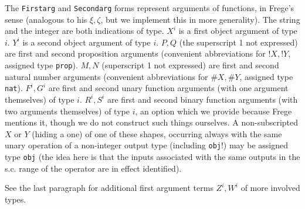 \documentclass{article}
\begin{document}
{{The {\tt Firstarg} and {\tt Secondarg} forms represent arguments of functions, in Frege's sense (analogous to his $\xi, \zeta$, but we implement this in more generality).  The string and the integer are both indications of type.  $X^i$ is a first object argument of type $i$.  $Y^i$ is a second object argument of type $i$.  $P, Q$ (the superscript 1 not expressed) are first and second proposition arguments (convenient abbreviations for $!X, !Y$, assigned type {\tt prop}).  $M, N$ (superscript 1 not expressed) are first and second natural number arguments  (convenient abbreviations for $\#X,\#Y$, assigned type {\tt nat}).  $F^i, G^i$ are first and second unary function arguments (with one argument themselves) of type $i$.  $R^i, S^i$ are first and second binary function arguments (with two arguments themselves) of type $i$, an option which we provide because Frege mentions it, though we do not construct such things ourselves.  A non-subscripted $X$ or $Y$ (hiding a one) of one of these shapes, occurring always with the same unary operation of a non-integer output type (including {\tt obj}!) may be assigned type {\tt obj} (the idea here is that the inputs associated with the same outputs in the s.c. range of the operator are in effect identified).

See the last paragraph for additional first argument terms $Z^i, W^i$ of more involved types.



}}
\end{document}
